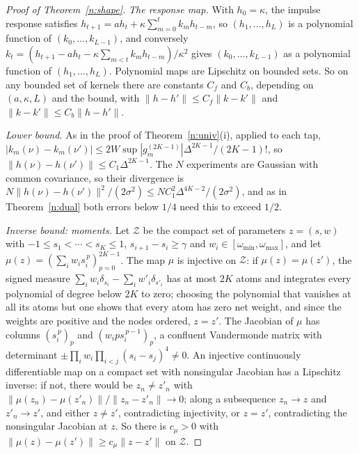 \documentclass[12pt]{article}
\theoremstyle{definition}
\theoremstyle{remark}
\begin{document}
\begin{proof}[Proof of Theorem~\ref{n:shape}]
\emph{The response map.} With $h_0=\kappa$, the impulse response satisfies $h_{t+1}=ah_t+\kappa\sum_{m=0}^tk_mh_{t-m}$, so $(h_1,\ldots,h_L)$ is a polynomial function of $(k_0,\ldots,k_{L-1})$, and conversely $k_t=(h_{t+1}-ah_t-\kappa\sum_{m<t}k_mh_{t-m})/\kappa^2$ gives $(k_0,\ldots,k_{L-1})$ as a polynomial function of $(h_1,\ldots,h_L)$. Polynomial maps are Lipschitz on bounded sets. So on any bounded set of kernels there are constants $C_f$ and $C_b$, depending on $(a,\kappa,L)$ and the bound, with $\|h-h'\|\le C_f\|k-k'\|$ and $\|k-k'\|\le C_b\|h-h'\|$.

\emph{Lower bound.} As in the proof of Theorem~\ref{n:univ}(i), applied to each tap, $|k_m(\nu)-k_m(\nu')|\le2W\sup|g_m^{(2K-1)}|\Delta^{2K-1}/(2K-1)!$, so $\|h(\nu)-h(\nu')\|\le C_1\Delta^{2K-1}$. The $N$ experiments are Gaussian with common covariance, so their divergence is $N\|h(\nu)-h(\nu')\|^2/(2\sigma^2)\le NC_1^2\Delta^{4K-2}/(2\sigma^2)$, and as in Theorem~\ref{n:dual} both errors below $1/4$ need this to exceed $1/2$.

\emph{Inverse bound: moments.} Let $\mathcal Z$ be the compact set of parameters $z=(s,w)$ with $-1\le s_1<\cdots<s_K\le1$, $s_{i+1}-s_i\ge\gamma$ and $w_i\in[\omega_{\min},\omega_{\max}]$, and let $\mu(z)=(\sum_iw_is_i^{\,p})_{p=0}^{2K-1}$. The map $\mu$ is injective on $\mathcal Z$: if $\mu(z)=\mu(z')$, the signed measure $\sum_iw_i\delta_{s_i}-\sum_iw'_i\delta_{s'_i}$ has at most $2K$ atoms and integrates every polynomial of degree below $2K$ to zero; choosing the polynomial that vanishes at all its atoms but one shows that every atom has zero net weight, and since the weights are positive and the nodes ordered, $z=z'$. The Jacobian of $\mu$ has columns $(s_i^{\,p})_p$ and $(w_ips_i^{\,p-1})_p$, a confluent Vandermonde matrix with determinant $\pm\prod_iw_i\prod_{i<j}(s_i-s_j)^4\ne0$. An injective continuously differentiable map on a compact set with nonsingular Jacobian has a Lipschitz inverse: if not, there would be $z_n\ne z'_n$ with $\|\mu(z_n)-\mu(z'_n)\|/\|z_n-z'_n\|\to0$; along a subsequence $z_n\to z$ and $z'_n\to z'$, and either $z\ne z'$, contradicting injectivity, or $z=z'$, contradicting the nonsingular Jacobian at $z$. So there is $c_\mu>0$ with $\|\mu(z)-\mu(z')\|\ge c_\mu\|z-z'\|$ on $\mathcal Z$.


\end{proof}
\end{document}
